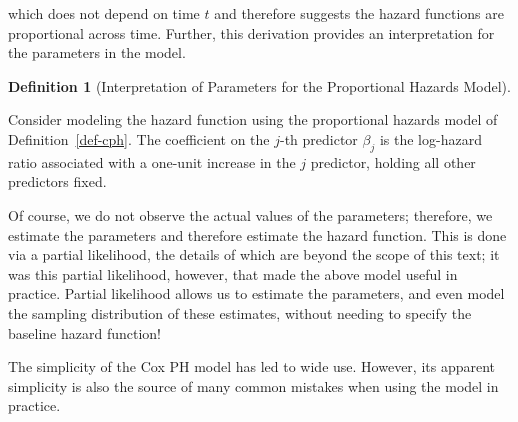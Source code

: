 \documentclass[
  letterpaper,
  DIV=11,
  numbers=noendperiod]{scrreprt}
\theoremstyle{definition}
\newtheorem{definition}{Definition}[chapter]
\theoremstyle{definition}
\theoremstyle{remark}
\begin{document}
which does not depend on time \(t\) and therefore suggests the hazard
functions are proportional across time. Further, this derivation
provides an interpretation for the parameters in the model.

\begin{definition}[Interpretation of Parameters for the Proportional
Hazards Model]\protect\hypertarget{def-hr}{}\label{def-hr}

Consider modeling the hazard function using the proportional hazards
model of Definition~\ref{def-cph}. The coefficient on the \(j\)-th
predictor \(\beta_j\) is the log-hazard ratio associated with a one-unit
increase in the \(j\) predictor, holding all other predictors fixed.

\end{definition}

Of course, we do not observe the actual values of the parameters;
therefore, we estimate the parameters and therefore estimate the hazard
function. This is done via a partial likelihood, the details of which
are beyond the scope of this text; it was this partial likelihood,
however, that made the above model useful in practice. Partial
likelihood allows us to estimate the parameters, and even model the
sampling distribution of these estimates, without needing to specify the
baseline hazard function!

The simplicity of the Cox PH model has led to wide use. However, its
apparent simplicity is also the source of many common mistakes when
using the model in practice.
\end{document}
